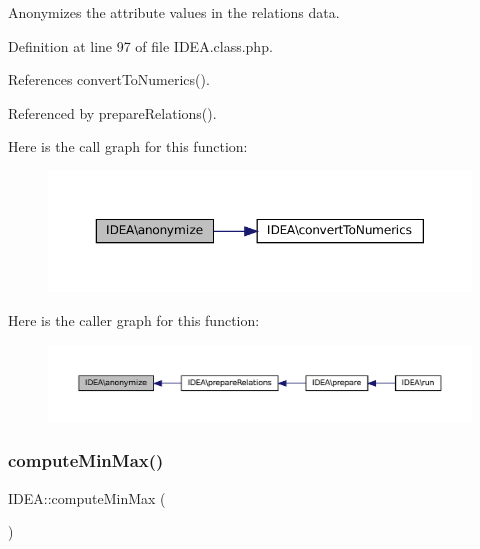 Anonymizes the attribute values in the relations data. 

Definition at line 97 of file I\+D\+E\+A.\+class.\+php.



References convert\+To\+Numerics().



Referenced by prepare\+Relations().

Here is the call graph for this function\+:\nopagebreak
\begin{figure}[H]
\begin{center}
\leavevmode
\includegraphics[width=350pt]{class_i_d_e_a_a9a426f6b9d366062c75ec915612129b0_cgraph}
\end{center}
\end{figure}
Here is the caller graph for this function\+:\nopagebreak
\begin{figure}[H]
\begin{center}
\leavevmode
\includegraphics[width=350pt]{class_i_d_e_a_a9a426f6b9d366062c75ec915612129b0_icgraph}
\end{center}
\end{figure}
\mbox{\label{class_i_d_e_a_aa5be6c475fac729b2933e6c42757e6b3}} 
\subsubsection{\texorpdfstring{compute\+Min\+Max()}{computeMinMax()}}
{\footnotesize\ttfamily I\+D\+E\+A\+::compute\+Min\+Max (\begin{DoxyParamCaption}{ }\end{DoxyParamCaption})\hspace{0.3cm}{\ttfamily [protected]}}

